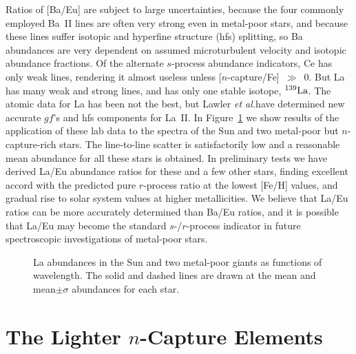 \documentclass{ws-p8-50x6-00}
\begin{document}
Ratios of [Ba/Eu] are subject to large uncertainties, because the four
commonly employed Ba~II lines are often very strong even in metal-poor stars, 
and because these lines suffer isotopic and hyperfine structure (hfs) 
splitting, so Ba abundances are very dependent on assumed microturbulent 
velocity and isotopic abundance fractions.  
Of the alternate $s$-process abundance indicators, Ce has only weak lines, 
rendering it almost useless unless [$n$-capture/Fe]~$\gg$~0.  
But La has many weak and strong lines, and has only one stable
isotope, $^{139}\rm {La}$.  
The atomic data for La has been not the best, but Lawler 
{\it et al.}\cite{La00}have determined new accurate $gf$'s and hfs 
components for La~II.  
In Figure~\ref{lasummary2} we show results of the application of 
these lab data to the spectra of the Sun and two metal-poor but 
$n$-capture-rich stars.  
The line-to-line scatter is satisfactorily low and a reasonable mean 
abundance for all these stars is obtained.  
In preliminary tests we have derived La/Eu abundance ratios for these 
and a few other stars, finding excellent accord with the predicted pure
$r$-process ratio at the lowest [Fe/H] values, and gradual rise to solar
system values at higher metallicities.  
We believe that La/Eu ratios can be more accurately determined than 
Ba/Eu ratios, and it is possible that La/Eu may become the standard  
$s$-/$r$-process indicator in future spectroscopic investigations 
of metal-poor stars.
 
\begin{figure}[t]
\epsfxsize=20pc %
\hspace*{0.5in}
\caption{La abundances in the Sun and two metal-poor giants as functions
of wavelength.
The solid and dashed lines are drawn at the mean and mean$\pm\sigma$
abundances for each star.
\label{lasummary2}}
\end{figure}







\section{The Lighter $n$-Capture Elements}
 
\end{document}
